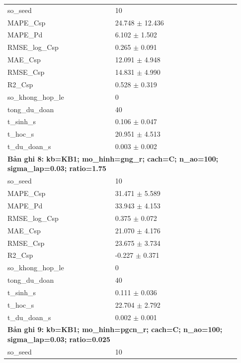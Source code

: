 \begin{longtable}{p{0.43\linewidth}p{0.50\linewidth}}
so\_\allowbreak seed & 10 \\
MAPE\_\allowbreak Csp & 24.748 $\pm$ 12.436 \\
MAPE\_\allowbreak Pd & 6.102 $\pm$ 1.502 \\
RMSE\_\allowbreak log\_\allowbreak Csp & 0.265 $\pm$ 0.091 \\
MAE\_\allowbreak Csp & 12.091 $\pm$ 4.948 \\
RMSE\_\allowbreak Csp & 14.831 $\pm$ 4.990 \\
R2\_\allowbreak Csp & 0.528 $\pm$ 0.319 \\
so\_\allowbreak khong\_\allowbreak hop\_\allowbreak le & 0 \\
tong\_\allowbreak du\_\allowbreak doan & 40 \\
t\_\allowbreak sinh\_\allowbreak s & 0.106 $\pm$ 0.047 \\
t\_\allowbreak hoc\_\allowbreak s & 20.951 $\pm$ 4.513 \\
t\_\allowbreak du\_\allowbreak doan\_\allowbreak s & 0.003 $\pm$ 0.002 \\
\midrule
\multicolumn{2}{p{0.95\linewidth}}{\textbf{Bản ghi 8: kb=KB1; mo\_hinh=gng\_r; cach=C; n\_ao=100; sigma\_lap=0.03; ratio=1.75}} \\
so\_\allowbreak seed & 10 \\
MAPE\_\allowbreak Csp & 31.471 $\pm$ 5.589 \\
MAPE\_\allowbreak Pd & 33.943 $\pm$ 4.153 \\
RMSE\_\allowbreak log\_\allowbreak Csp & 0.375 $\pm$ 0.072 \\
MAE\_\allowbreak Csp & 21.070 $\pm$ 4.176 \\
RMSE\_\allowbreak Csp & 23.675 $\pm$ 3.734 \\
R2\_\allowbreak Csp & -0.227 $\pm$ 0.371 \\
so\_\allowbreak khong\_\allowbreak hop\_\allowbreak le & 0 \\
tong\_\allowbreak du\_\allowbreak doan & 40 \\
t\_\allowbreak sinh\_\allowbreak s & 0.111 $\pm$ 0.036 \\
t\_\allowbreak hoc\_\allowbreak s & 22.704 $\pm$ 2.792 \\
t\_\allowbreak du\_\allowbreak doan\_\allowbreak s & 0.002 $\pm$ 0.001 \\
\midrule
\multicolumn{2}{p{0.95\linewidth}}{\textbf{Bản ghi 9: kb=KB1; mo\_hinh=pgcn\_r; cach=C; n\_ao=100; sigma\_lap=0.03; ratio=0.025}} \\
so\_\allowbreak seed & 10 \\

\end{longtable}
